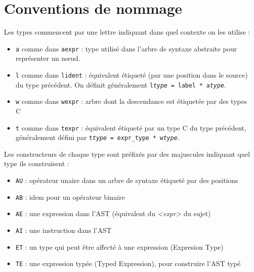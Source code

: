 \documentclass[a4paper]{article}
\begin{document}
\appendix
\section{Conventions de nommage}

Les types commencent par une lettre indiquant dans quel contexte on les utilise :
\begin{itemize}
    \item \texttt{a} comme dans \texttt{aexpr} : type utilisé dans l'arbre de syntaxe abstraite pour représenter un nœud.
    \item \texttt{l} comme dans \texttt{lident} : équivalent étiqueté (par une position dans le source) du type précédent.
    On définit généralement \texttt{l\emph{type} = label * a\emph{type}}.
\item \texttt{w} comme dans \texttt{wexpr} : arbre dont la descendance est étiquetée par des types C
\item \texttt{t} comme dans \texttt{texpr} : équivalent étiqueté par un type C du type précédent, généralement défini par \texttt{t\emph{type} = expr\_type * w\emph{type}}.
\end{itemize}

Les constructeurs de chaque type sont préfixés par des majuscules indiquant quel type ils construisent :
\begin{itemize}
    \item \texttt{AU} : opérateur unaire dans un arbre de syntaxe étiqueté par des positions
    \item \texttt{AB} : idem pour un opérateur binaire
    \item \texttt{AE} : une expression dans l'AST (équivalent du \emph{<expr>} du sujet)
    \item \texttt{AI} : une instruction dans l'AST
    \item \texttt{ET} : un type qui peut être affecté à une expression (Expresion Type)
    \item \texttt{TE} : une expression typée (Typed Expression), pour construire l'AST typé
\end{itemize}
\end{document}
